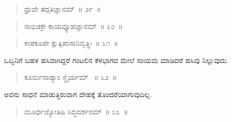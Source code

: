 
\vfill\eject

\vspace{-0.3cm}

\begin{verse}
ಧ್ರುವೇ ತದ್ಗತಿಜ್ಞಾನಮ್​~॥ ೨೯~॥
\end{verse}

\vspace{-0.3cm}


\vspace{-0.3cm}

\begin{verse}
ನಾಭಿಚಕ್ರೇ ಕಾಯವ್ಯೂಹಜ್ಞಾನಮ್​~॥ ೩೦~॥
\end{verse}

\vspace{-0.3cm}


\vspace{-0.3cm}

\begin{verse}
ಕಂಠಕೂಪೇ ಕ್ಷುತ್ಪಿಪಾಸಾನಿವೃತ್ಥಿಃ~॥ ೩೧~॥
\end{verse}

\vspace{-0.3cm}


ಒಬ್ಬನಿಗೆ ಬಹಳ ಹಸಿವಾಗಿದ್ದರೆ ಗಂಟಲಿನ ಕೆಳಭಾಗದ ಮೇಲೆ ಸಂಯಮ ಮಾಡಿದರೆ ಹಸಿವು ನಿಲ್ಲುವುದು. 

\vspace{-0.3cm}

\begin{verse}
ಕೂರ್ಮನಾಡ್ಯಾಂ ಸ್ಥೈರ್ಯಮ್ ~॥ ೩೨~॥
\end{verse}

\vspace{-0.3cm}


ಅವನು ಸಾಧನೆ ಮಾಡುತ್ತಿರುವಾಗ ದೇಹಕ್ಕೆ ತೊಂದರೆಯಾಗುವುದಿಲ್ಲ. 

\vspace{-0.3cm}

\begin{verse}
ಮೂರ್ಧಜ್ಯೋತಿಷಿ ಸಿದ್ಧದರ್ಶನಮ್​~॥ ೩೩~॥
\end{verse}

\vspace{-0.3cm}


